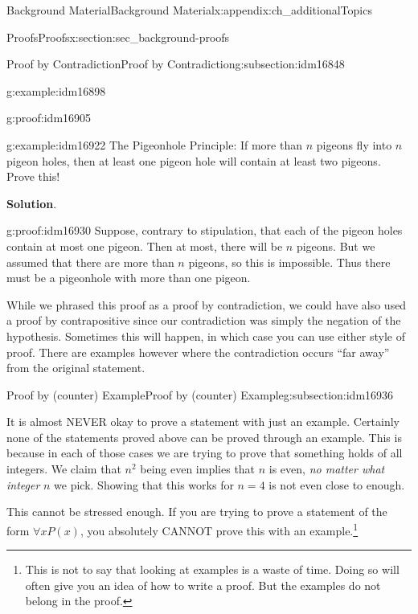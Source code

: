 \documentclass[oneside,10pt,]{book}
\numberwithin{equation}{chapter}
\begin{document}
\begin{appendixptx}{Background Material}{}{Background Material}{}{}{x:appendix:ch_additionalTopics}
\begin{sectionptx}{Proofs}{}{Proofs}{}{}{x:section:sec_background-proofs}
\begin{subsectionptx}{Proof by Contradiction}{}{Proof by Contradiction}{}{}{g:subsection:idm16848}
\begin{example}{}{g:example:idm16898}
\begin{proofptx}{}{g:proof:idm16905}
\end{proofptx}
\end{example}
\begin{example}{}{g:example:idm16922}%
The Pigeonhole Principle: If more than \(n\) pigeons fly into \(n\) pigeon holes, then at least one pigeon hole will contain at least two pigeons. Prove this!%
\par\smallskip%
\noindent\textbf{Solution}.\hypertarget{g:solution:idm16929}{}\quad{}\begin{proofptx}{}{g:proof:idm16930}
Suppose, contrary to stipulation, that each of the pigeon holes contain at most one pigeon. Then at most, there will be \(n\) pigeons. But we assumed that there are more than \(n\) pigeons, so this is impossible. Thus there must be a pigeonhole with more than one pigeon.%
\end{proofptx}
While we phrased this proof as a proof by contradiction, we could have also used a proof by contrapositive since our contradiction was simply the negation of the hypothesis. Sometimes this will happen, in which case you can use either style of proof. There are examples however where the contradiction occurs ``far away'' from the original statement.%
\end{example}
\end{subsectionptx}
%
%
\typeout{************************************************}
\typeout{************************************************}
%
\begin{subsectionptx}{Proof by (counter) Example}{}{Proof by (counter) Example}{}{}{g:subsection:idm16936}
%
\par
It is almost NEVER okay to prove a statement with just an example. Certainly none of the statements proved above can be proved through an example. This is because in each of those cases we are trying to prove that something holds of all integers. We claim that \(n^2\) being even implies that \(n\) is even, \emph{no matter what integer} \(n\) we pick. Showing that this works for \(n = 4\) is not even close to enough.%
\par
This cannot be stressed enough. If you are trying to prove a statement of the form \(\forall x P(x)\), you absolutely CANNOT prove this with an example.\footnote{This is not to say that looking at examples is a waste of time. Doing so will often give you an idea of how to write a proof. But the examples do not belong in the proof.\label{g:fn:idm16950}}%
\par

\end{subsectionptx}
\end{sectionptx}
\end{appendixptx}
\end{document}
